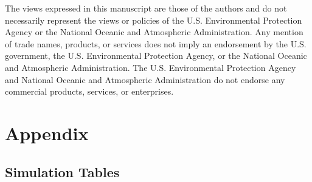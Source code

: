 \documentclass[]{article}    %
\begin{document}
The views expressed in this manuscript are those of the authors and do
not necessarily represent the views or policies of the U.S.
Environmental Protection Agency or the National Oceanic and Atmospheric
Administration. Any mention of trade names, products, or services does
not imply an endorsement by the U.S. government, the U.S. Environmental
Protection Agency, or the National Oceanic and Atmospheric
Administration. The U.S. Environmental Protection Agency and National
Oceanic and Atmospheric Administration do not endorse any commercial
products, services, or enterprises.

\setcounter{table}{0}
\setcounter{subsection}{0}
\renewcommand{\thetable}{A\arabic{table}}
\renewcommand{\thesubsection}{A.\arabic{subsection}:}

\hypertarget{appendix}{%
\section*{Appendix}\label{appendix}}

\subsection{Simulation Tables}
\end{document}
